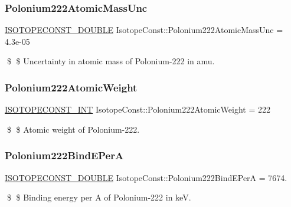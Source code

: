 \subsubsection{\texorpdfstring{Polonium222\+Atomic\+Mass\+Unc}{Polonium222AtomicMassUnc}}
{\footnotesize\ttfamily \mbox{\hyperlink{group___isotope_const-_macros_ga8f45a7272ce02c0b4c65c44636ed719a}{I\+S\+O\+T\+O\+P\+E\+C\+O\+N\+S\+T\+\_\+\+D\+O\+U\+B\+LE}} Isotope\+Const\+::\+Polonium222\+Atomic\+Mass\+Unc = 4.\+3e-\/05}

\$ \$ Uncertainty in atomic mass of Polonium-\/222 in amu. \mbox{\label{group___isotope_const-_polonium-_po222_gabbf20ea8af74bd27ba3dc85e10d5f71f}} 
\subsubsection{\texorpdfstring{Polonium222\+Atomic\+Weight}{Polonium222AtomicWeight}}
{\footnotesize\ttfamily \mbox{\hyperlink{group___isotope_const-_macros_ga5f18360b3e99483a35c32d789e62621c}{I\+S\+O\+T\+O\+P\+E\+C\+O\+N\+S\+T\+\_\+\+I\+NT}} Isotope\+Const\+::\+Polonium222\+Atomic\+Weight = 222}

\$ \$ Atomic weight of Polonium-\/222. \mbox{\label{group___isotope_const-_polonium-_po222_gabc3fb623ee57f871021c533561b3aca6}} 
\subsubsection{\texorpdfstring{Polonium222\+Bind\+E\+PerA}{Polonium222BindEPerA}}
{\footnotesize\ttfamily \mbox{\hyperlink{group___isotope_const-_macros_ga8f45a7272ce02c0b4c65c44636ed719a}{I\+S\+O\+T\+O\+P\+E\+C\+O\+N\+S\+T\+\_\+\+D\+O\+U\+B\+LE}} Isotope\+Const\+::\+Polonium222\+Bind\+E\+PerA = 7674.}

\$ \$ Binding energy per A of Polonium-\/222 in keV. \mbox{\label{group___isotope_const-_polonium-_po222_ga3fc65d67b4f35eabd643fd0293f6d65d}} 
